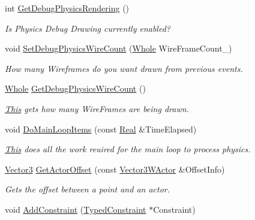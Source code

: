 \begin{DoxyCompactItemize}
int \hyperlink{classphys_1_1PhysicsManager_a64f96d2e4b25c2b9a66042998bf334ff}{GetDebugPhysicsRendering} ()
\begin{DoxyCompactList}\small\item\em Is Physics Debug Drawing currently enabled? \item\end{DoxyCompactList}\item 
void \hyperlink{classphys_1_1PhysicsManager_ab43a963cf26ca4293a7c34a2a68c4f2c}{SetDebugPhysicsWireCount} (\hyperlink{namespacephys_a460f6bc24c8dd347b05e0366ae34f34a}{Whole} WireFrameCount\_\-)
\begin{DoxyCompactList}\small\item\em How many Wireframes do you want drawn from previous events. \item\end{DoxyCompactList}\item 
\hyperlink{namespacephys_a460f6bc24c8dd347b05e0366ae34f34a}{Whole} \hyperlink{classphys_1_1PhysicsManager_a8f46e55e4cadfcd1c2c03bcdbfe6c06f}{GetDebugPhysicsWireCount} ()
\begin{DoxyCompactList}\small\item\em \hyperlink{structThis}{This} gets how many WireFrames are being drawn. \item\end{DoxyCompactList}\item 
void \hyperlink{classphys_1_1PhysicsManager_ad363d6683a0276395eeb2c42a56f95fc}{DoMainLoopItems} (const \hyperlink{namespacephys_af7eb897198d265b8e868f45240230d5f}{Real} \&TimeElapsed)
\begin{DoxyCompactList}\small\item\em \hyperlink{structThis}{This} does all the work reuired for the main loop to process physics. \item\end{DoxyCompactList}\item 
\hyperlink{classphys_1_1Vector3}{Vector3} \hyperlink{classphys_1_1PhysicsManager_a54a48fdfd9db914c25a0f892c2f56301}{GetActorOffset} (const \hyperlink{classphys_1_1Vector3WActor}{Vector3WActor} \&OffsetInfo)
\begin{DoxyCompactList}\small\item\em Gets the offset between a point and an actor. \item\end{DoxyCompactList}\item 
void \hyperlink{classphys_1_1PhysicsManager_ab31bf38e9ed68c484946731546425691}{AddConstraint} (\hyperlink{classphys_1_1TypedConstraint}{TypedConstraint} $\ast$Constraint)

\end{DoxyCompactItemize}
